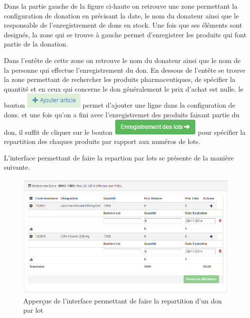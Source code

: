 \documentclass[12pt,a4paper]{report}
\begin{document}
Dans la partie gauche de la figure ci-haute on retrouve une zone permettant la configuration de donation en précisant la date, le nom du donateur  ainsi que le responsable de l'enregistrement de dons en stock. Une fois que ses éléments sont designés, la zone qui se trouve à gauche permet d'enregistrer les produits qui font partie de la donation.

Dans l'entête de cette zone on retrouve le nom du donateur ainsi que le nom de la personne qui effectue l'enregistrement du don. En dessous de l'entête se trouve la zone permettant de rechercher les produits pharmaceutiques, de spécifier la quantité et en ceux qui concerne le don généralement le prix d'achat est nulle. le bouton \includegraphics[scale=0.7]{pic/AjArticleGreen.png} permet d'ajouter une ligne dans la configuration de dons. et une fois qu'on a fini avec l'enregistremet des produits faisant partie du don, il suffit de cliquer sur le bouton \includegraphics[scale=0.7]{pic/EnregistrLots.png} pour spécifier la repartition des chaques produits par rapport aux numéros de lots.

L'interface permettant de faire la repartion par lots se présente de la manière suivante.

\begin{figure}[h]
\begin{center}
\includegraphics[width=14cm]{pic/LotByDon.png}
\end{center}
\caption{Apperçue de l'interface permettant de faire la repartition d'un don par lot}
\label{Apperçue de l'interface permettant de faire la repartition d'un don par lot}
\end{figure}
\end{document}
